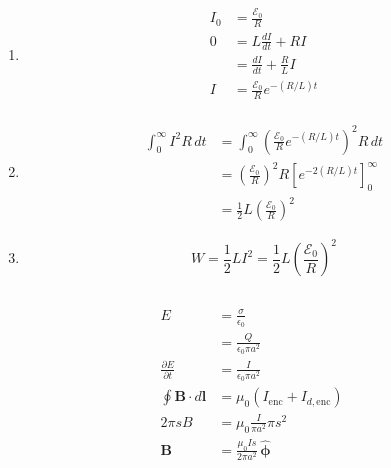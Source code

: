 \documentclass{article}
\renewcommand{\vec}[1]{\boldsymbol{\mathbf{#1}}}
\newcommand{\uvec}[1]{\hat{\vec{#1}}}
\begin{document}
\subsection{}

\begin{enumerate}
  \item

        \begin{align*}
          I_0 & = \frac{\mathcal{E}_0}{R}                \\
          0   & = L \frac{d I}{d t} + R I                \\
              & = \frac{d I}{d t} + \frac{R}{L} I        \\
          I   & = \frac{\mathcal{E}_0}{R} e^{-(R / L) t} \\
        \end{align*}

  \item

        \begin{align*}
          \int_0^\infty I^2 R \,d t & = \int_0^\infty \left( \frac{\mathcal{E}_0}{R} e^{-(R / L) t} \right)^2 R \,d t       \\
                                    & = \left( \frac{\mathcal{E}_0}{R} \right)^2 R \left[ e^{-2 (R / L) t} \right]_0^\infty \\
                                    & = \frac{1}{2} L \left( \frac{\mathcal{E}_0}{R} \right)^2
        \end{align*}

  \item \[W = \frac{1}{2} L I^2 = \frac{1}{2} L \left( \frac{\mathcal{E}_0}{R} \right)^2\]
\end{enumerate}

\setcounter{subsection}{33}
\subsection{}

\begin{align*}
  E                             & = \frac{\sigma}{\epsilon_0}                 \\
                                & = \frac{Q}{\epsilon_0 \pi a^2}              \\
  \frac{\partial E}{\partial t} & = \frac{I}{\epsilon_0 \pi a^2}              \\
  \oint \vec{B} \cdot d \vec{l} & = \mu_0 (I_\text{enc} + I_{d,\text{enc}})   \\
  2 \pi s B                     & = \mu_0 \frac{I}{\pi a^2} \pi s^2           \\
  \vec{B}                       & = \frac{\mu_0 I s}{2 \pi a^2} \,\uvec{\phi}
\end{align*}
\end{document}
